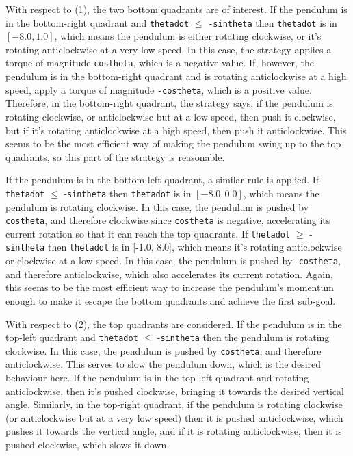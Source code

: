 With respect to (1), the two bottom quadrants are of interest. If the pendulum is in the bottom-right quadrant and \verb+thetadot+ $\leq$ \verb+-sintheta+ then \verb+thetadot+ is in $[-8.0, 1.0]$, which means the pendulum is either rotating clockwise, or it's rotating anticlockwise at a very low speed. In this case, the strategy applies a torque of magnitude \verb+costheta+, which is a negative value. If, however, the pendulum is in the bottom-right quadrant and is rotating anticlockwise at a high speed, apply a torque of magnitude \verb+-costheta+, which is a positive value. Therefore, in the bottom-right quadrant, the strategy says, if the pendulum is rotating clockwise, or anticlockwise but at a low speed, then push it clockwise, but if it's rotating anticlockwise at a high speed, then push it anticlockwise. This seems to be the most efficient way of making the pendulum swing up to the top quadrants, so this part of the strategy is reasonable. 

If the pendulum is in the bottom-left quadrant, a similar rule is applied. If \verb+thetadot+ $\leq$ -\verb+sintheta+ then \verb+thetadot+ is in $[-8.0, 0.0]$, which means the pendulum is rotating clockwise. In this case, the pendulum is pushed by \verb+costheta+, and therefore clockwise since \verb+costheta+ is negative, accelerating its current rotation so that it can reach the top quadrants. If \verb+thetadot+ $\geq$ -\verb+sintheta+ then \verb+thetadot+ is in [-1.0, 8.0], which means it's rotating anticlockwise or clockwise at a low speed. In this case, the pendulum is pushed by -\verb+costheta+, and therefore anticlockwise, which also accelerates its current rotation. Again, this seems to be the most efficient way to increase the pendulum's momentum enough to make it escape the bottom quadrants and achieve the first sub-goal.

With respect to (2), the top quadrants are considered. If the pendulum is in the top-left quadrant and \verb+thetadot+ $\leq$ -\verb+sintheta+ then the pendulum is rotating clockwise. In this case, the pendulum is pushed by \verb+costheta+, and therefore anticlockwise. This serves to slow the pendulum down, which is the desired behaviour here. If the pendulum is in the top-left quadrant and rotating anticlockwise, then it's pushed clockwise, bringing it towards the desired vertical angle. Similarly, in the top-right quadrant, if the pendulum is rotating clockwise (or anticlockwise but at a very low speed) then it is pushed anticlockwise, which pushes it towards the vertical angle, and if it is rotating anticlockwise, then it is pushed clockwise, which slows it down.

